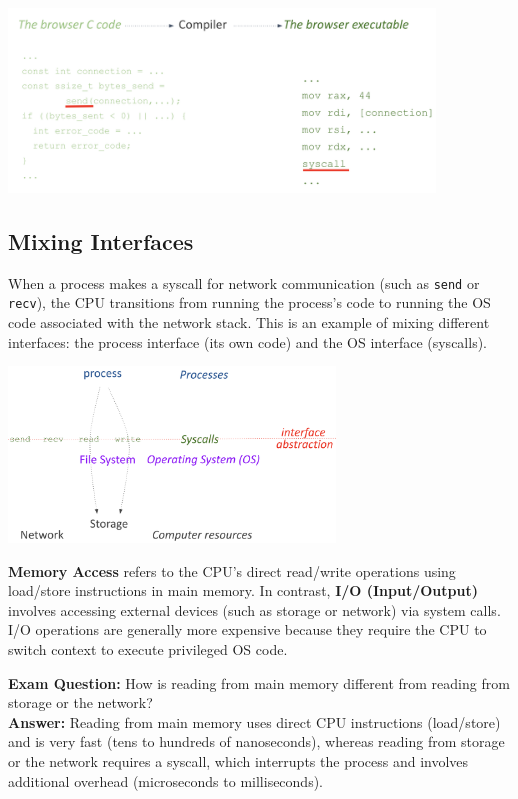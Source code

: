 \begin{center}
  \includegraphics[width=0.85\textwidth]{chapters/L1/images/syscalls2.png}
\end{center}
\newpage
\subsection{Mixing Interfaces}
When a process makes a syscall for network communication (such as \texttt{send} or \texttt{recv}), the CPU transitions from running the process’s code to running the OS code associated with the network stack. This is an example of mixing different interfaces: the process interface (its own code) and the OS interface (syscalls).
\begin{center}
  \includegraphics[width=0.65\textwidth]{chapters/L1/images/mix_int.png}
\end{center}
\vfill
\begin{definition}
\textbf{Memory Access} refers to the CPU’s direct read/write operations using load/store instructions in main memory. In contrast, \textbf{I/O (Input/Output)} involves accessing external devices (such as storage or network) via system calls. I/O operations are generally more expensive because they require the CPU to switch context to execute privileged OS code.
\end{definition}
\vspace{0.5em}
\textbf{Exam Question:} How is reading from main memory different from reading from storage or the network? \\[0.5em]
\textbf{Answer:} Reading from main memory uses direct CPU instructions (load/store) and is very fast (tens to hundreds of nanoseconds), whereas reading from storage or the network requires a syscall, which interrupts the process and involves additional overhead (microseconds to milliseconds).
